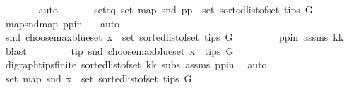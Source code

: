 \begin{isabellebody}
\ \ \ \ \ \ \isamarkupfalse%
\ auto\ \isanewline
\ \ \ \ \isamarkupfalse%
\ seteq{\isacharcolon}{\kern0pt}\ {\isachardoublequoteopen}set\ {\isacharparenleft}{\kern0pt}map\ snd\ pp{\isacharparenright}{\kern0pt}\ {\isacharequal}{\kern0pt}\ set\ {\isacharparenleft}{\kern0pt}sorted{\isacharunderscore}{\kern0pt}list{\isacharunderscore}{\kern0pt}of{\isacharunderscore}{\kern0pt}set\ {\isacharparenleft}{\kern0pt}tips\ G{\isacharparenright}{\kern0pt}{\isacharparenright}{\kern0pt}{\isachardoublequoteclose}\ \isanewline
\ \ \ \ \ \ \isamarkupfalse%
\ map{\isacharunderscore}{\kern0pt}snd{\isacharunderscore}{\kern0pt}map\ pp{\isacharunderscore}{\kern0pt}in\ \ \isamarkupfalse%
\ auto\isanewline
\ \ \ \ \isamarkupfalse%
\ \isamarkupfalse%
\ {\isachardoublequoteopen}snd\ {\isacharparenleft}{\kern0pt}choose{\isacharunderscore}{\kern0pt}max{\isacharunderscore}{\kern0pt}blue{\isacharunderscore}{\kern0pt}set\ x{\isacharparenright}{\kern0pt}\ {\isasymin}\ set\ {\isacharparenleft}{\kern0pt}sorted{\isacharunderscore}{\kern0pt}list{\isacharunderscore}{\kern0pt}of{\isacharunderscore}{\kern0pt}set\ {\isacharparenleft}{\kern0pt}tips\ G{\isacharparenright}{\kern0pt}{\isacharparenright}{\kern0pt}{\isachardoublequoteclose}\ \isanewline
\ \ \ \ \ \ \isamarkupfalse%
\ pp{\isacharunderscore}{\kern0pt}in\ assms{\isacharparenleft}{\kern0pt}{}{\isacharparenright}{\kern0pt}\ kk\ \isamarkupfalse%
\ blast\ \isanewline
\ \ \ \ \isamarkupfalse%
\ \isamarkupfalse%
\ tip{\isacharcolon}{\kern0pt}\ {\isachardoublequoteopen}snd\ {\isacharparenleft}{\kern0pt}choose{\isacharunderscore}{\kern0pt}max{\isacharunderscore}{\kern0pt}blue{\isacharunderscore}{\kern0pt}set\ x{\isacharparenright}{\kern0pt}\ {\isasymin}\ tips\ G{\isachardoublequoteclose}\isanewline
\ \ \ \ \ \ \isamarkupfalse%
\ digraph{\isachardot}{\kern0pt}tips{\isacharunderscore}{\kern0pt}finite\ sorted{\isacharunderscore}{\kern0pt}list{\isacharunderscore}{\kern0pt}of{\isacharunderscore}{\kern0pt}set{\isacharparenleft}{\kern0pt}{}{\isacharparenright}{\kern0pt}\ kk\ subs\ assms\ pp{\isacharunderscore}{\kern0pt}in\ \isamarkupfalse%
\ auto\isanewline
\ \ \ \ \isamarkupfalse%
\ {\isachardoublequoteopen}set\ {\isacharparenleft}{\kern0pt}map\ snd\ x{\isacharparenright}{\kern0pt}\ {\isacharequal}{\kern0pt}\ set\ {\isacharparenleft}{\kern0pt}sorted{\isacharunderscore}{\kern0pt}list{\isacharunderscore}{\kern0pt}of{\isacharunderscore}{\kern0pt}set\ {\isacharparenleft}{\kern0pt}tips\ G{\isacharparenright}{\kern0pt}{\isacharparenright}{\kern0pt}{\isachardoublequoteclose}\isanewline

\end{isabellebody}
